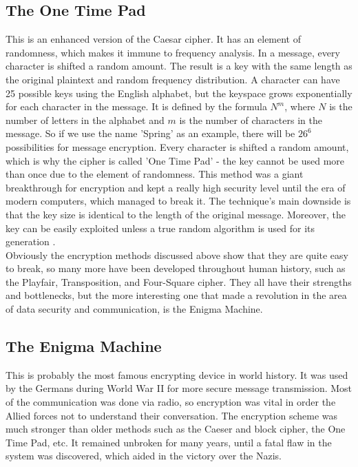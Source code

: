 \documentclass[a4paper, 12pt, titlepage]{article}
\begin{document}
\subsection{The One Time Pad}
This is an enhanced version of the Caesar cipher. It has an element of randomness, which makes it immune to frequency analysis. In a message, every character is shifted a random amount. The result is a key with the same length as the original plaintext and random frequency distribution. A character can have 25 possible keys using the English alphabet, but the keyspace grows exponentially for each character in the message. It is defined by the formula $N^m$, where $N$ is the number of letters in the alphabet and $m$ is the number of characters in the message. So if we use the name 'Spring' as an example, there will be $26^6$ possibilities for message encryption. Every character is shifted a random amount, which is why the cipher is called 'One Time Pad' - the key cannot be used more than once due to the element of randomness. This method was a giant breakthrough for encryption and kept a really high security level until the era of modern computers, which managed to break it. The technique's main downside is that the key size is identical to the length of the original message. Moreover, the key can be easily exploited unless a true random algorithm is used for its generation \cite{OneTimePad}. \\[6pt]
Obviously the encryption methods discussed above show that they are quite easy to break, so many more have been developed throughout human history, such as the Playfair, Transposition, and Four-Square cipher. They all have their strengths and bottlenecks, but the more interesting one that made a revolution in the area of data security and communication, is the Enigma Machine.

\subsection{The Enigma Machine}
This is probably the most famous encrypting device in world history. It was used by the Germans during World War II for more secure message transmission. Most of the communication was done via radio, so encryption was vital in order the Allied forces not to understand their conversation. The encryption scheme was much stronger than older methods such as the Caeser and block cipher, the One Time Pad, etc. It remained unbroken for many years, until a fatal flaw in the system was discovered, which aided in the victory over the Nazis.
\end{document}
